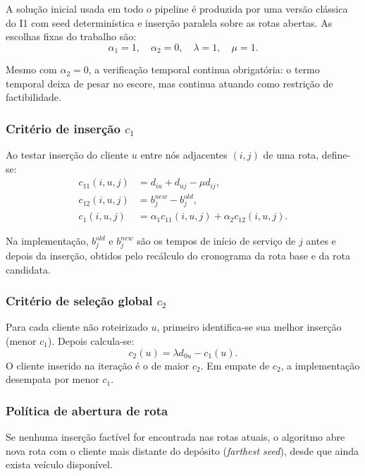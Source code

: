 A solução inicial usada em todo o pipeline é produzida por uma versão clássica do I1 com seed determinística e inserção paralela sobre as rotas abertas.
As escolhas fixas do trabalho são:
\[
\alpha_1=1,\quad \alpha_2=0,\quad \lambda=1,\quad \mu=1.
\]

Mesmo com $\alpha_2=0$, a verificação temporal continua obrigatória: o termo temporal deixa de pesar no escore, mas continua atuando como restrição de factibilidade.

\subsubsection{Critério de inserção $c_1$}

Ao testar inserção do cliente $u$ entre nós adjacentes $(i,j)$ de uma rota, define-se:
\begin{align}
 c_{11}(i,u,j) &= d_{iu} + d_{uj} - \mu d_{ij}, \\
 c_{12}(i,u,j) &= b_j^{new} - b_j^{old}, \\
 c_1(i,u,j) &= \alpha_1 c_{11}(i,u,j) + \alpha_2 c_{12}(i,u,j).
\end{align}

Na implementação, $b_j^{old}$ e $b_j^{new}$ são os tempos de início de serviço de $j$ antes e depois da inserção, obtidos pelo recálculo do cronograma da rota base e da rota candidata.

\subsubsection{Critério de seleção global $c_2$}

Para cada cliente não roteirizado $u$, primeiro identifica-se sua melhor inserção (menor $c_1$).
Depois calcula-se:
\[
 c_2(u)=\lambda d_{0u}-c_1(u).
\]
O cliente inserido na iteração é o de maior $c_2$.
Em empate de $c_2$, a implementação desempata por menor $c_1$.

\subsubsection{Política de abertura de rota}

Se nenhuma inserção factível for encontrada nas rotas atuais, o algoritmo abre nova rota com o cliente mais distante do depósito (\emph{farthest seed}), desde que ainda exista veículo disponível.

